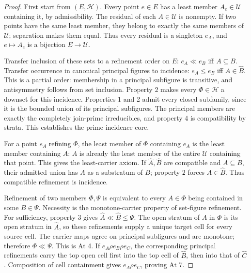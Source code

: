 \begin{proof}
First start from \((E,\mathscr H)\). Every point \(e\in E\) has a
least member \(A_e\in\mathscr U\) containing it, by admissibility.
The residual of each \(A\in\mathscr U\) is nonempty. If two points
have the same least member, they belong to exactly the same members
of \(\mathscr U\); separation makes them equal. Thus every residual
is a singleton \(e_A\), and \(e\mapsto A_e\) is a bijection
\(E\to\mathscr U\).

Transfer inclusion of these sets to a refinement order on \(E\):
\(e_A\ll e_B\) iff \(A\subseteq B\). Transfer occurrence in
canonical principal figures to incidence:
\(e_A\leq e_B\) iff \(A\in\widehat B\). This is a partial order:
membership in a principal subfigure is transitive, and antisymmetry
follows from set inclusion. Property 2 makes every
\(\Phi\in\mathscr H\) a downset for this incidence. Properties 1
and 2 admit every closed subfamily, since it is the bounded union
of its principal subfigures. The principal members are exactly the
completely join-prime irreducibles, and property 4 is compatibility
by strata. This establishes the prime incidence core.

For a point \(e_A\) refining \(\Phi\), the least member of \(\Phi\)
containing \(e_A\) is the least member containing \(A\):
\(A\) is already the least member of the entire \(\mathscr U\)
containing that point. This gives the least-carrier axiom.
If \(\widehat A,\widehat B\) are compatible and \(A\subseteq B\),
their admitted union has \(A\) as a substratum of \(B\);
property 2 forces \(A\in\widehat B\). Thus compatible refinement
is incidence.

Refinement of two members \(\Phi,\Psi\) is equivalent to every
\(A\in\Phi\) being contained in some \(B\in\Psi\). Necessity is
the monotone-carrier property of set-figure refinement. For
sufficiency, property 3 gives
\(\widehat A\ll\widehat B\leq\Psi\). The open stratum of \(A\)
in \(\Phi\) is its open stratum in \(\widehat A\), so these
refinements supply a unique target cell for every source cell.
The carrier maps agree on principal subfigures and are monotone;
therefore \(\Phi\ll\Psi\). This is At 4. If
\(e_A\rho e_B\rho e_C\), the corresponding principal
refinements carry the top open cell first into the top cell of
\(\widehat B\), then into that of \(\widehat C\). Composition of
cell containment gives \(e_A\rho e_C\), proving At 7.


\end{proof}
